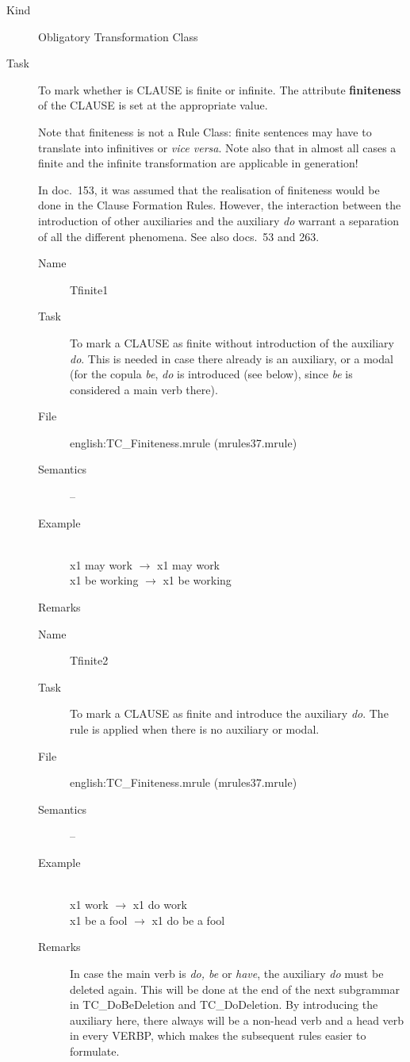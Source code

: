 \begin{description}
\item[Kind] Obligatory Transformation Class
\item[Task] To mark whether is CLAUSE is finite or infinite. The attribute {\bf
finiteness} of the CLAUSE is set at the appropriate value.

Note that finiteness is not a Rule Class: finite sentences may have to 
translate into infinitives or {\em vice versa\/}. Note also that in almost all 
cases a finite and the infinite transformation are applicable in generation!

In doc.\ 153, it was assumed that the realisation of finiteness would be done 
in the Clause Formation Rules. However, the interaction between the 
introduction of other auxiliaries and the auxiliary {\em do\/} warrant a 
separation of all the different phenomena. 
See also docs.\ 53 and 263.

\vspace{1 cm}
\begin{description}
\item[Name] Tfinite1
\item[Task] To mark a CLAUSE as finite without introduction of the auxiliary 
{\em do\/}. This is needed in case there already is an auxiliary, or a modal
(for the copula {\em be\/}, {\em do\/} is introduced (see below), since 
{\em be\/} is considered a main verb there).
\item[File] english:TC\_Finiteness.mrule (mrules37.mrule)
\item[Semantics] --
\item[Example] \mbox{}\\
 x1 may work $\rightarrow$ x1 may work\\
x1 be working $\rightarrow$ x1 be working
\item[Remarks] 
\end{description}

\vspace{1 cm}
\begin{description}
\item[Name] Tfinite2
\item[Task] To mark a CLAUSE as finite and introduce the auxiliary 
{\em do\/}. The rule is applied when there is no auxiliary or modal.
\item[File] english:TC\_Finiteness.mrule (mrules37.mrule)
\item[Semantics] --
\item[Example] \mbox{}\\
 x1 work $\rightarrow$ x1 do work\\
x1 be a fool $\rightarrow$ x1 do be a fool
\item[Remarks] In case the main verb is {\em do, be\/} or {\em have\/}, the 
auxiliary {\em do\/} must be deleted again. This will be done at the end of the 
next subgrammar in TC\_DoBeDeletion and TC\_DoDeletion. By introducing the 
auxiliary here, there always will be a non-head verb and a head verb in every 
VERBP, which makes the subsequent rules easier to formulate.
\end{description}


\end{description}
